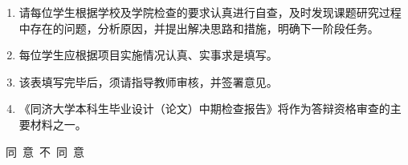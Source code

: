 
\begin{tjformnoticebody}
\begin{enumerate}[label=\arabic*.,leftmargin=2em,labelsep=0.5em]
  \item 请每位学生根据学校及学院检查的要求认真进行自查，及时发现课题研究过程中存在的问题，分析原因，并提出解决思路和措施，明确下一阶段任务。
  \item 每位学生应根据项目实施情况认真、实事求是填写。
  \item 该表填写完毕后，须请指导教师审核，并签署意见。
  \item 《同济大学本科生毕业设计（论文）中期检查报告》将作为答辩资格审查的主要材料之一。
\end{enumerate}
\end{tjformnoticebody}

\clearpage






\begin{tjreviewbox}

  \vspace{7\baselineskip}
\end{tjreviewbox}

\begin{tjreviewbox}

  \vspace{1.5\baselineskip}
  ~同\ 意\qquad{}~不\ 同\ 意

  \vspace{5\baselineskip}
\end{tjreviewbox}
